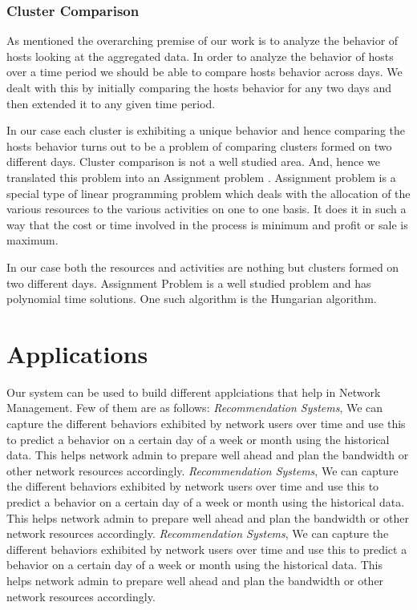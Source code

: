 \subsubsection*{Cluster Comparison}
As mentioned the overarching premise of our work is to analyze the behavior of hosts looking at the aggregated data. In order to analyze the behavior of hosts over a time period we should be able to compare hosts behavior across days. We dealt with this by initially comparing the hosts behavior for any two days and then extended it to any given time period.

In our case each cluster is exhibiting a unique behavior and hence comparing the hosts behavior turns out to be a problem of comparing clusters formed on two different days. Cluster comparison is not a well studied area. And, hence we translated this problem into an Assignment problem \cite{kuhn1955hungarian}. Assignment problem is a special type of linear programming problem which deals with the allocation of the various resources to the various activities on one to one basis. It does it in such a way that the cost or time involved in the process is minimum and profit or sale is maximum. 

In our case both the resources and activities are nothing but clusters formed on two different days. Assignment Problem is a well studied problem and has polynomial time solutions. One such algorithm is the Hungarian algorithm. 

\section{Applications}
Our system can be used to build different applciations that help in Network Management. Few of them are as follows:
\textit{Recommendation Systems}, We can capture the different behaviors exhibited by network users over time and use this to predict a behavior on a certain day of a week or month using the historical data. This helps network admin to prepare well ahead and plan the bandwidth or other network resources accordingly.
\textit{Recommendation Systems}, We can capture the different behaviors exhibited by network users over time and use this to predict a behavior on a certain day of a week or month using the historical data. This helps network admin to prepare well ahead and plan the bandwidth or other network resources accordingly.
\textit{Recommendation Systems}, We can capture the different behaviors exhibited by network users over time and use this to predict a behavior on a certain day of a week or month using the historical data. This helps network admin to prepare well ahead and plan the bandwidth or other network resources accordingly.




